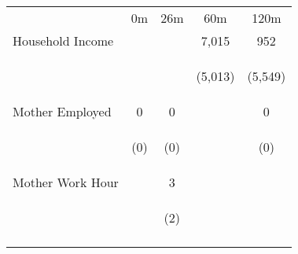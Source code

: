 \begin{tabular}{lcccc}
\hline \noalign{\smallskip} & 0m & 26m & 60m & 120m\\
\noalign{\smallskip}\hline \noalign{\smallskip}Household Income &  &  & 7,015 & 952\\
 & \begin{footnotesize}\end{footnotesize} & \begin{footnotesize}\end{footnotesize} & \begin{footnotesize}(5,013)\end{footnotesize} & \begin{footnotesize}(5,549)\end{footnotesize}\\
\noalign{\smallskip}Mother Employed & 0 & 0 &  & 0\\
 & \begin{footnotesize}(0)\end{footnotesize} & \begin{footnotesize}(0)\end{footnotesize} & \begin{footnotesize}\end{footnotesize} & \begin{footnotesize}(0)\end{footnotesize}\\
\noalign{\smallskip}Mother Work Hour &  & 3 &  & \\
 & \begin{footnotesize}\end{footnotesize} & \begin{footnotesize}(2)\end{footnotesize} & \begin{footnotesize}\end{footnotesize} & \begin{footnotesize}\end{footnotesize}\\
\noalign{\smallskip}\hline\end{tabular}\\
